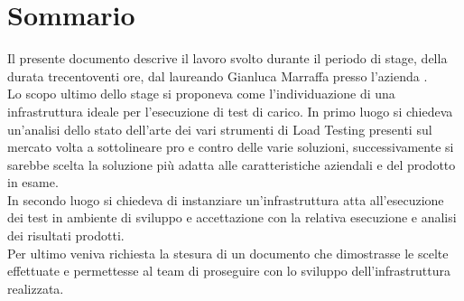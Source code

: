 
\cleardoublepage
{}
{}
\begingroup
\let\clearpage\relax
\let\cleardoublepage\relax
\let\cleardoublepage\relax

\chapter*{Sommario}

Il presente documento descrive il lavoro svolto durante il periodo di stage, della durata trecentoventi ore, dal laureando Gianluca Marraffa presso l'azienda \myCompany. \\
Lo scopo ultimo dello stage si proponeva come l'individuazione di una infrastruttura ideale per l'esecuzione di test di carico. In primo luogo si chiedeva un'analisi dello stato dell'arte dei vari strumenti di Load Testing presenti sul mercato volta a sottolineare pro e contro delle varie soluzioni, successivamente si sarebbe scelta la soluzione più adatta alle caratteristiche aziendali e del prodotto in esame. \\
In secondo luogo si chiedeva di instanziare un'infrastruttura atta all'esecuzione dei test in ambiente di sviluppo e accettazione con la relativa esecuzione e analisi dei risultati prodotti. \\
Per ultimo veniva richiesta la stesura di un documento che dimostrasse le scelte effettuate e permettesse al team di proseguire con lo sviluppo dell'infrastruttura realizzata.

%
%

\endgroup			

\vfill

